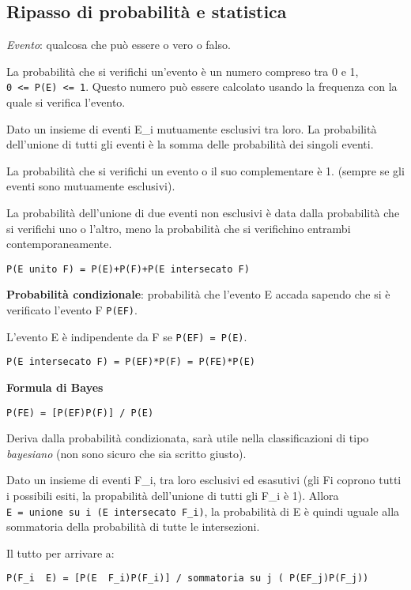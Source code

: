 \subsection{Ripasso di probabilità e
statistica}\label{ripasso-di-probabilituxe0-e-statistica}

\emph{Evento}: qualcosa che può essere o vero o falso.

La probabilità che si verifichi un'evento è un numero compreso tra 0 e
1, \texttt{0\ \textless{}=\ P(E)\ \textless{}=\ 1}. Questo numero può
essere calcolato usando la frequenza con la quale si verifica l'evento.

Dato un insieme di eventi E\_i mutuamente esclusivi tra loro. La
probabilità dell'unione di tutti gli eventi è la somma delle probabilità
dei singoli eventi.

La probabilità che si verifichi un evento o il suo complementare è 1.
(sempre se gli eventi sono mutuamente esclusivi).

La probabilità dell'unione di due eventi non esclusivi è data dalla
probabilità che si verifichi uno o l'altro, meno la probabilità che si
verifichino entrambi contemporaneamente.

\texttt{P(E\ unito\ F)\ =\ P(E)+P(F)+P(E\ intersecato\ F)}

\textbf{Probabilità condizionale}: probabilità che l'evento E accada
sapendo che si è verificato l'evento F \texttt{P(E\textbar{}F)}.

L'evento E è indipendente da F se \texttt{P(E\textbar{}F)\ =\ P(E)}.

\texttt{P(E\ intersecato\ F)\ =\ P(E\textbar{}F)*P(F)\ =\ P(F\textbar{}E)*P(E)}

\textbf{Formula di Bayes}

\texttt{P(F\textbar{}E)\ =\ {[}P(E\textbar{}F)P(F){]}\ /\ P(E)}

Deriva dalla probabilità condizionata, sarà utile nella classificazioni
di tipo \emph{bayesiano} (non sono sicuro che sia scritto giusto).

Dato un insieme di eventi F\_i, tra loro esclusivi ed esasutivi (gli Fi
coprono tutti i possibili esiti, la propabilità dell'unione di tutti gli
F\_i è 1). Allora \texttt{E\ =\ unione\ su\ i\ (E\ intersecato\ F\_i)},
la probabilità di E è quindi uguale alla sommatoria della probabilità di
tutte le intersezioni.

Il tutto per arrivare a:

\texttt{P(F\_i\ \textbar{}\ E)\ =\ {[}P(E\ \textbar{}\ F\_i)P(F\_i){]}\ /\ sommatoria\ su\ j\ (\ P(E\textbar{}F\_j)P(F\_j))}

